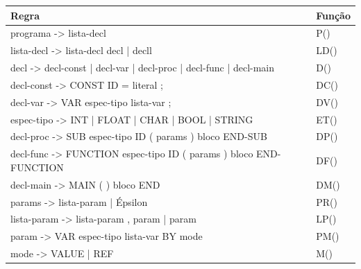\documentclass[12pt,oneside,a4paper,chapter=TITLE,section=TITLE,sumario=tradicional]{abntex2}
\begin{document}
\begin{quadro}[htb]
    \centering
    \vspace{0.5cm}
    \begin{tabular}[h]{|p{13.0cm}|p{2.0cm}|}
        \hline
        \textbf{Regra} & \textbf{Função} \\ 
        \hline\hline
	programa -> lista-decl  & P()   \\ \hline 
	lista-decl -> lista-decl decl | decll  & LD()   \\ \hline 
	decl -> decl-const | decl-var | decl-proc | decl-func | decl-main  & D() \\ \hline
	decl-const -> CONST ID = literal ;  & DC()   \\ \hline 
	decl-var -> VAR espec-tipo lista-var ;  & DV()   \\ \hline 
	espec-tipo -> INT | FLOAT | CHAR | BOOL | STRING  & ET()   \\ \hline 
	decl-proc -> SUB espec-tipo ID ( params ) bloco END-SUB  & DP()   \\ \hline 
	decl-func -> FUNCTION espec-tipo ID ( params ) bloco END-FUNCTION  & DF()   \\ \hline 
	decl-main -> MAIN ( ) bloco END  & DM()   \\ \hline 
	params -> lista-param | Épsilon  & PR()   \\ \hline 
	lista-param -> lista-param , param | param  & LP()   \\ \hline 
	param -> VAR espec-tipo lista-var BY mode  & PM()   \\ \hline 
	mode -> VALUE | REF  & M()   \\ \hline 
    \end{tabular}
\end{quadro}
\end{document}
